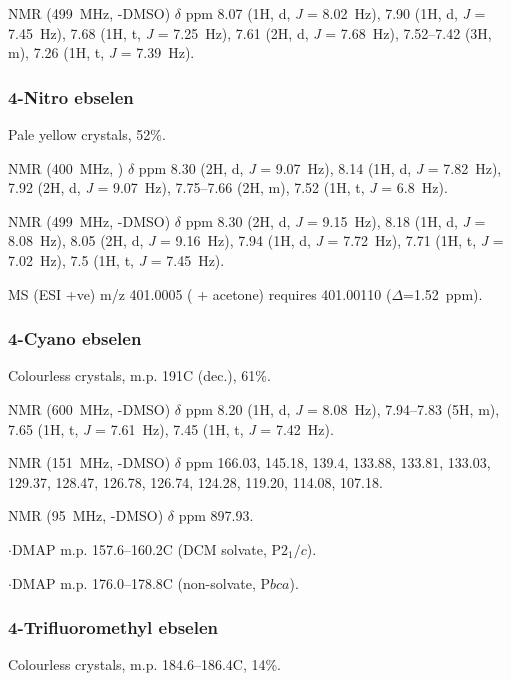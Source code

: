 \begin{refsection}
 NMR (499~MHz, -DMSO) $\delta$ ppm 8.07 (1H, d, \emph{J} = 8.02~Hz), 7.90 (1H, d, \emph{J} = 7.45~Hz), 7.68 (1H, t, \emph{J} = 7.25~Hz), 7.61 (2H, d, \emph{J} = 7.68~Hz), 7.52--7.42 (3H, m), 7.26 (1H, t, \emph{J} = 7.39~Hz).

\subsubsection{4-Nitro ebselen }
Pale yellow crystals, 52\%.

 NMR (400~MHz, ) $\delta$ ppm 8.30 (2H, d, \emph{J} = 9.07~Hz), 8.14 (1H, d, \emph{J} = 7.82~Hz), 7.92 (2H, d, \emph{J} = 9.07~Hz), 7.75--7.66 (2H, m), 7.52 (1H, t, \emph{J} = 6.8~Hz).

 NMR (499~MHz, -DMSO) $\delta$ ppm 8.30 (2H, d, \emph{J} = 9.15~Hz), 8.18 (1H, d, \emph{J} = 8.08~Hz), 8.05 (2H, d, \emph{J} = 9.16~Hz), 7.94 (1H, d, \emph{J} = 7.72~Hz), 7.71 (1H, t, \emph{J} = 7.02~Hz), 7.5 (1H, t, \emph{J} = 7.45~Hz).

MS (ESI +ve) m/z 401.0005 ( + acetone)  requires 401.00110 ($\Delta$=1.52~ppm).

\subsubsection{4-Cyano ebselen }
Colourless crystals, m.p. 191\degree C (dec.), 61\%.

 NMR (600~MHz, -DMSO) $\delta$ ppm 8.20 (1H, d, \emph{J} = 8.08~Hz), 7.94--7.83 (5H, m), 7.65 (1H, t, \emph{J} = 7.61~Hz), 7.45 (1H, t, \emph{J} = 7.42~Hz).

 NMR (151~MHz, -DMSO) $\delta$ ppm 166.03, 145.18, 139.4, 133.88, 133.81, 133.03, 129.37, 128.47, 126.78, 126.74, 124.28, 119.20, 114.08, 107.18.

 NMR (95~MHz, -DMSO) $\delta$ ppm 897.93.

$\cdot$DMAP m.p. 157.6--160.2\degree C (DCM solvate, P$2_1/c$).

$\cdot$DMAP m.p. 176.0--178.8\degree C (non-solvate, P$bca$).

\subsubsection{4-Trifluoromethyl ebselen }
Colourless crystals, m.p. 184.6--186.4\degree C, 14\%.


\end{refsection}
